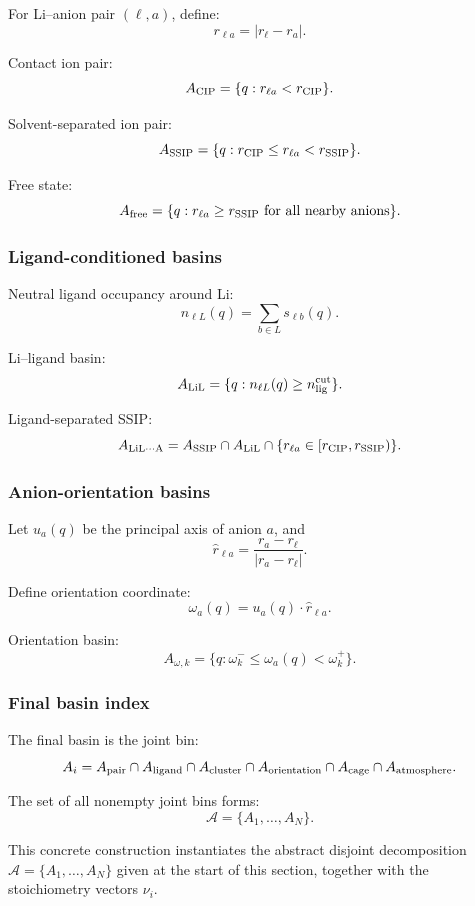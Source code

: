 \documentclass[11pt]{article}
\begin{document}
For Li--anion pair \((\ell,a)\), define:
\[
r_{\ell a}=|r_\ell-r_a|.
\]

Contact ion pair:
\[
A_{\rm CIP}
=
\{q:r_{\ell a}<r_{\rm CIP}\}.
\]

Solvent-separated ion pair:
\[
A_{\rm SSIP}
=
\{q:r_{\rm CIP}\le r_{\ell a}<r_{\rm SSIP}\}.
\]

Free state:
\[
A_{\rm free}
=
\{q:r_{\ell a}\ge r_{\rm SSIP}\ \text{for all nearby anions}\}.
\]

\subsubsection{Ligand-conditioned basins}

Neutral ligand occupancy around Li:
\[
n_{\ell L}(q)=\sum_{b\in L}s_{\ell b}(q).
\]

Li--ligand basin:
\[
A_{\rm LiL}
=
\{q:n_{\ell L}(q)\ge n_{\rm lig}^{\rm cut}\}.
\]

Ligand-separated SSIP:
\[
A_{\rm LiL\cdots A}
=
A_{\rm SSIP}
\cap
A_{\rm LiL}
\cap
\{r_{\ell a}\in[r_{\rm CIP},r_{\rm SSIP})\}.
\]

\subsubsection{Anion-orientation basins}

Let \(u_a(q)\) be the principal axis of anion \(a\), and
\[
\hat r_{\ell a}=\frac{r_a-r_\ell}{|r_a-r_\ell|}.
\]

Define orientation coordinate:
\[
\omega_a(q)=u_a(q)\cdot \hat r_{\ell a}.
\]

Orientation basin:
\[
A_{\omega,k}
=
\{q:\omega_k^-\le\omega_a(q)<\omega_k^+\}.
\]

\subsubsection{Final basin index}

The final basin is the joint bin:
\[
A_i=
A_{\rm pair}
\cap
A_{\rm ligand}
\cap
A_{\rm cluster}
\cap
A_{\rm orientation}
\cap
A_{\rm cage}
\cap
A_{\rm atmosphere}.
\]

The set of all nonempty joint bins forms:
\[
\mathcal A=\{A_1,\ldots,A_N\}.
\]

This concrete construction instantiates the abstract disjoint decomposition
\(\mathcal A=\{A_1,\ldots,A_N\}\) given at the start of this section, together
with the stoichiometry vectors \(\nu_i\).
\end{document}

